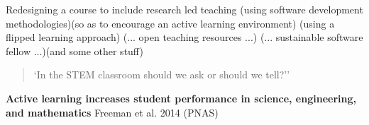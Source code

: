 \documentclass{beamer}
\begin{document}
    \begin{frame}
        \begin{center}
            \Large

            Redesigning a course to include research led teaching (using
            software development methodologies)\pause (so as to encourage an
            active learning environment) \pause (using a flipped learning
            approach) \pause (... open teaching resources ...) \pause
            (... sustainable software fellow ...)\pause (and some other stuff)

        \end{center}
    \end{frame}

    \begin{frame}
        \small
        \begin{quote}
            `In the STEM classroom should we ask or should we tell?''
        \end{quote}

        \begin{center}
            \textbf{Active learning increases student performance in
            science, engineering, and mathematics} Freeman et al. 2014 (PNAS)
        \end{center}
    \end{frame}
\end{document}
